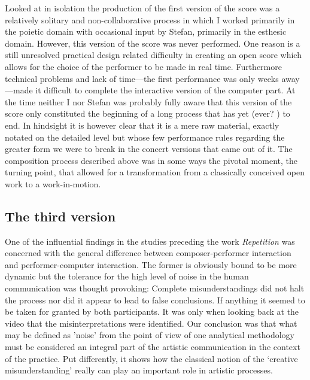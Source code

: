 Looked at in isolation the production of the first version of the
score was a relatively solitary and non-collaborative process in which
I worked primarily in the poietic domain with occasional input by
Stefan, primarily in the esthesic domain. However, this version of the
score was never performed. One reason is a still unresolved practical
design related difficulty in creating an open score which allows for
the choice of the performer to be made in real time.  Furthermore
technical problems and lack of time---the first performance was only
weeks away---made it difficult to complete the interactive version of
the computer part. At the time neither I nor Stefan was probably fully
aware that this version of the score only constituted the beginning of
a long process that has yet (ever? ) to end. In hindsight it is
however clear that it is a mere raw material, exactly notated on the
detailed level but whose few performance rules regarding the greater
form we were to break in the concert versions that came out of it. The
composition process described above was in some ways the pivotal
moment, the turning point, that allowed for a transformation from a
classically conceived open work to a work-in-motion.

\subsection{The third version}
\label{sec:third-version-1}

One of the influential findings in the studies preceding the work
\emph{Repetition} was concerned with the general difference between
composer-performer interaction and performer-computer interaction. The
former is obviously bound to be more dynamic but the tolerance for the
high level of noise in the human communication was thought provoking:
Complete misunderstandings did not halt the process nor did it appear
to lead to false conclusions. If anything it seemed to be taken for
granted by both participants. It was only when looking back at the
video that the misinterpretations were identified. Our conclusion was
that what may be defined as 'noise' from the point of view of one
analytical methodology must be considered an integral part of the
artistic communication in the context of the practice. Put
differently, it shows how the classical notion of the `creative
misunderstanding' really can play an important role in artistic
processes. 

